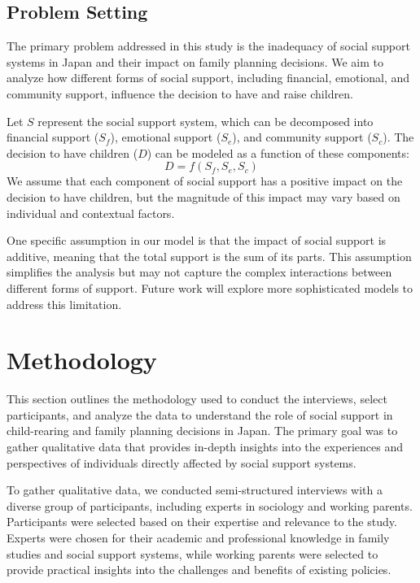 \documentclass{article} %
\begin{document}
\subsection{Problem Setting}
\label{sec:problem_setting}

The primary problem addressed in this study is the inadequacy of social support systems in Japan and their impact on family planning decisions. We aim to analyze how different forms of social support, including financial, emotional, and community support, influence the decision to have and raise children.

Let \( S \) represent the social support system, which can be decomposed into financial support (\( S_f \)), emotional support (\( S_e \)), and community support (\( S_c \)). The decision to have children (\( D \)) can be modeled as a function of these components: 
\[ D = f(S_f, S_e, S_c) \]
We assume that each component of social support has a positive impact on the decision to have children, but the magnitude of this impact may vary based on individual and contextual factors.

One specific assumption in our model is that the impact of social support is additive, meaning that the total support is the sum of its parts. This assumption simplifies the analysis but may not capture the complex interactions between different forms of support. Future work will explore more sophisticated models to address this limitation.

\section{Methodology}
\label{sec:method}

This section outlines the methodology used to conduct the interviews, select participants, and analyze the data to understand the role of social support in child-rearing and family planning decisions in Japan. The primary goal was to gather qualitative data that provides in-depth insights into the experiences and perspectives of individuals directly affected by social support systems.

To gather qualitative data, we conducted semi-structured interviews with a diverse group of participants, including experts in sociology and working parents. Participants were selected based on their expertise and relevance to the study. Experts were chosen for their academic and professional knowledge in family studies and social support systems, while working parents were selected to provide practical insights into the challenges and benefits of existing policies.
\end{document}
